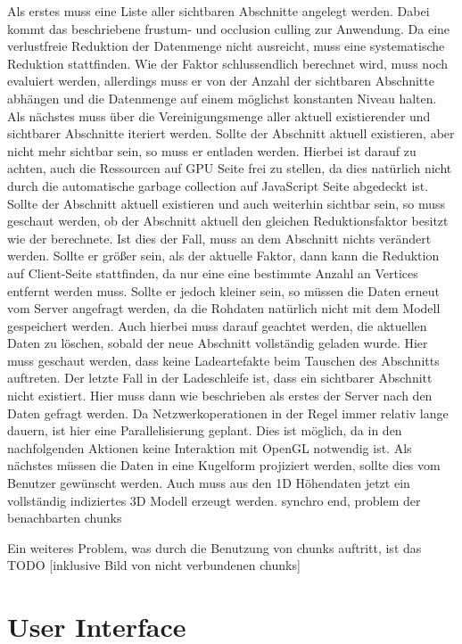 Als erstes muss eine Liste aller sichtbaren Abschnitte angelegt werden. Dabei kommt das beschriebene frustum- und occlusion culling zur Anwendung. Da eine verlustfreie Reduktion der Datenmenge nicht ausreicht, muss eine systematische Reduktion stattfinden. Wie der Faktor schlussendlich berechnet wird, muss noch evaluiert werden, allerdings muss er von der Anzahl der sichtbaren Abschnitte abhängen und die Datenmenge auf einem möglichst konstanten Niveau halten. Als nächstes muss über die Vereinigungsmenge aller aktuell existierender und sichtbarer Abschnitte iteriert werden. Sollte der Abschnitt aktuell existieren, aber nicht mehr sichtbar sein, so muss er entladen werden. Hierbei ist darauf zu achten, auch die Ressourcen auf GPU Seite frei zu stellen, da dies natürlich nicht durch die automatische garbage collection auf JavaScript Seite abgedeckt ist. Sollte der Abschnitt aktuell existieren und auch weiterhin sichtbar sein, so muss geschaut werden, ob der Abschnitt aktuell den gleichen Reduktionsfaktor besitzt wie der berechnete. Ist dies der Fall, muss an dem Abschnitt nichts verändert werden. Sollte er größer sein, als der aktuelle Faktor, dann kann die Reduktion auf Client-Seite stattfinden, da nur eine eine bestimmte Anzahl an Vertices entfernt werden muss. Sollte er jedoch kleiner sein, so müssen die Daten erneut vom Server angefragt werden, da die Rohdaten natürlich nicht mit dem Modell gespeichert werden. Auch hierbei muss darauf geachtet werden, die aktuellen Daten zu löschen, sobald der neue Abschnitt vollständig geladen wurde. Hier muss geschaut werden, dass keine Ladeartefakte beim Tauschen des Abschnitts auftreten. Der letzte Fall in der Ladeschleife ist, dass ein sichtbarer Abschnitt nicht existiert. Hier muss dann wie beschrieben als erstes der Server nach den Daten gefragt werden. Da Netzwerkoperationen in der Regel immer relativ lange dauern, ist hier eine Parallelisierung geplant. Dies ist möglich, da in den nachfolgenden Aktionen keine Interaktion mit OpenGL notwendig ist. Als nächstes müssen die Daten in eine Kugelform projiziert werden, sollte dies vom Benutzer gewünscht werden. Auch muss aus den 1D Höhendaten jetzt ein vollständig indiziertes 3D Modell erzeugt werden. synchro end, problem der benachbarten chunks


Ein weiteres Problem, was durch die Benutzung von chunks auftritt, ist das TODO [inklusive Bild von nicht verbundenen chunks]


\section{User Interface}

